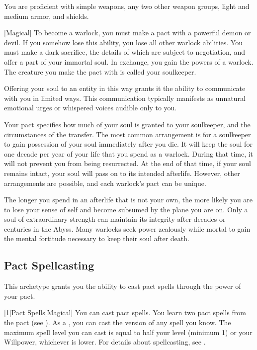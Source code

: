         You are proficient with simple weapons, any two other weapon groups, light and medium armor, and shields.

        [Magical]
        To become a warlock, you must make a pact with a powerful demon or devil.
        If you somehow lose this ability, you lose all other warlock abilities.
        You must make a dark sacrifice, the details of which are subject to negotiation, and offer a part of your immortal soul.
        In exchange, you gain the powers of a warlock.
        The creature you make the pact with is called your soulkeeper.

        Offering your soul to an entity in this way grants it the ability to communicate with you in limited ways.
        This communication typically manifests as unnatural emotional urges or whispered voices audible only to you.

        Your pact specifies how much of your soul is granted to your soulkeeper, and the circumstances of the transfer.
        The most common arrangement is for a soulkeeper to gain possession of your soul immediately after you die.
        It will keep the soul for one decade per year of your life that you spend as a warlock.
        During that time, it will not prevent you from being resurrected.
        At the end of that time, if your soul remains intact, your soul will pass on to its intended afterlife.
        However, other arrangements are possible, and each warlock's pact can be unique.

        The longer you spend in an afterlife that is not your own, the more likely you are to lose your sense of self and become subsumed by the plane you are on.
        Only a soul of extraordinary strength can maintain its integrity after decades or centuries in the Abyss.
        Many warlocks seek power zealously while mortal to gain the mental fortitude necessary to keep their soul after death.

    \subsection{Pact Spellcasting}
        This archetype grants you the ability to cast pact spells through the power of your pact.

        [1]{Pact Spells}[Magical]
        You can cast pact spells.
        You learn two pact spells from the pact  (see ).
        As a , you can cast the  version of any spell you know.
        The maximum spell level you can cast is equal to half your level (minimum 1) or your Willpower, whichever is lower.
        For details about spellcasting, see .


